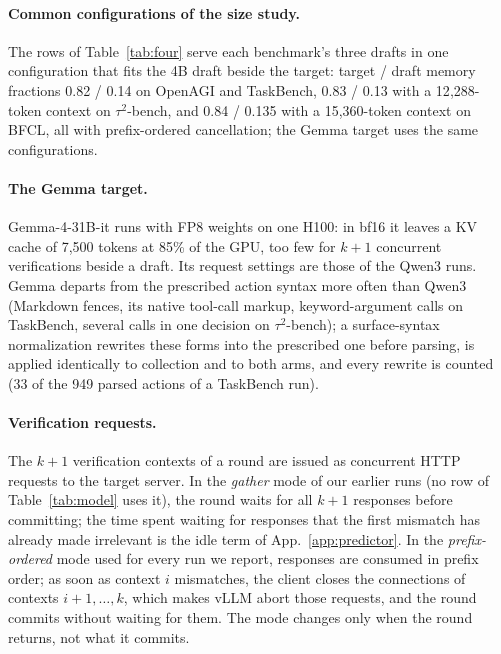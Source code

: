 \paragraph{Common configurations of the size study.}
The rows of Table~\ref{tab:four} serve each benchmark's three drafts in one configuration that fits the 4B
draft beside the target: target / draft memory fractions 0.82 / 0.14 on OpenAGI and TaskBench, 0.83 / 0.13
with a 12{,}288-token context on $\tau^2$-bench, and 0.84 / 0.135 with a 15{,}360-token context on BFCL, all
with prefix-ordered cancellation; the Gemma target uses the same configurations.

\paragraph{The Gemma target.} Gemma-4-31B-it runs with FP8 weights on one H100: in bf16 it leaves a KV cache of
7{,}500 tokens at 85\% of the GPU, too few for $k{+}1$ concurrent verifications beside a draft. Its request
settings are those of the Qwen3 runs. Gemma departs from the prescribed action syntax more often than Qwen3
(Markdown fences, its native tool-call markup, keyword-argument calls on TaskBench, several calls in one
decision on $\tau^2$-bench); a surface-syntax normalization rewrites these forms into the prescribed one
before parsing, is applied identically to collection and to both arms, and every rewrite is counted (33 of
the 949 parsed actions of a TaskBench run).

\paragraph{Verification requests.}
The $k{+}1$ verification contexts of a round are issued as concurrent HTTP
requests to the target server. In the \emph{gather} mode of our earlier runs (no row of Table~\ref{tab:model} uses it), the round waits for all $k{+}1$ responses before
committing; the time spent waiting for responses that the first mismatch has
already made irrelevant is the idle term of App.~\ref{app:predictor}. In the \emph{prefix-ordered} mode used for every run we report, responses are consumed
in prefix order; as soon as context $i$ mismatches, the client closes the connections of
contexts $i{+}1,\dots,k$, which makes vLLM abort those requests, and the round
commits without waiting for them. The mode changes only when the round returns,
not what it commits.

